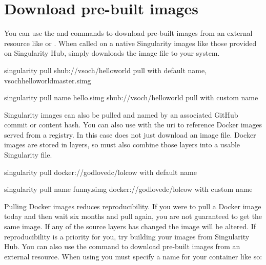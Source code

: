 \documentclass[letterpaper,10pt,english]{sphinxmanual}
\begin{document}
\section{Download pre-built images}
\label{\detokenize{quick_start:download-pre-built-images}}
You can use the  and  commands to download pre-built images from an
external resource like  or . When called
on a native Singularity images like those provided on Singularity Hub, 
simply downloads the image file to your system.

%
\begin{sphinxVerbatim}[commandchars=\\\{\}]
\PYGZdl{} singularity pull shub://vsoch/hello\PYGZhy{}world   \PYGZsh{} pull with default name, vsoch\PYGZhy{}hello\PYGZhy{}world\PYGZhy{}master.simg

\PYGZdl{} singularity pull \PYGZhy{}\PYGZhy{}name hello.simg shub://vsoch/hello\PYGZhy{}world   \PYGZsh{} pull with custom name
\end{sphinxVerbatim}

Singularity images can also be pulled and named by an associated
GitHub commit or content hash.
You can also use  with the  uri to reference Docker images served from a
registry. In this case  does not just download an image file. Docker
images are stored in layers, so  must also combine those layers into a
usable Singularity file.

%
\begin{sphinxVerbatim}[commandchars=\\\{\}]
\PYGZdl{} singularity pull docker://godlovedc/lolcow  \PYGZsh{} with default name

\PYGZdl{} singularity pull \PYGZhy{}\PYGZhy{}name funny.simg docker://godlovedc/lolcow \PYGZsh{} with custom name
\end{sphinxVerbatim}

Pulling Docker images reduces reproducibility. If you were to pull a
Docker image today and then wait six months and pull again, you are
not guaranteed to get the same image. If any of the source layers has
changed the image will be altered. If reproducibility is a priority
for you, try building your images from Singularity Hub.
You can also use the  command to download pre-built images from an
external resource. When using  you must specify a name for your
container like so:
\end{document}
